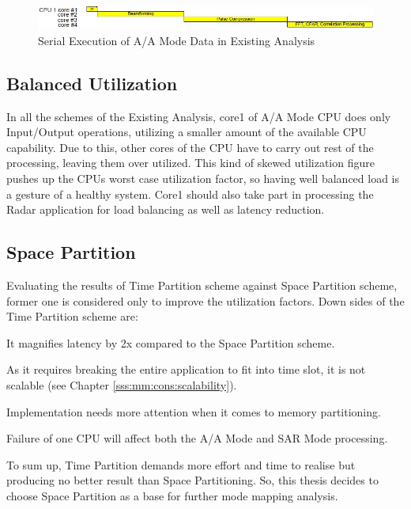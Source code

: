\begin{figure}[h!]
	\centering
	\includegraphics[width=160mm]{figures/aa_serial_exe}
	\caption{Serial Execution of A/A Mode Data in Existing Analysis}
	\label{fig:mm:aa_serial_exe}
\end{figure}

\subsection{Balanced Utilization}
In all the schemes of the Existing Analysis, core1 of A/A Mode CPU does only Input/Output operations, utilizing a smaller amount of the available CPU capability. Due to this, other cores of the CPU have to carry out rest of the processing, leaving them over utilized. This kind of skewed utilization figure pushes up the CPUs worst case utilization factor, so having well balanced load is a gesture of a healthy system. Core1 should also take part in processing the Radar application for load balancing as well as latency reduction. \vspace*{0.2cm}

\subsection{Space Partition}
Evaluating the results of Time Partition scheme against Space Partition scheme, former one is considered only to improve the utilization factors. Down sides of the Time Partition scheme are:
\begin{compactitem} 
\item It magnifies latency by 2x compared to the Space Partition scheme.
\item As it requires breaking the entire application to fit into time slot, it is not scalable (see Chapter \ref{sss:mm:cons:scalability}).
\item Implementation needs more attention when it comes to memory partitioning.
\item Failure of one CPU will affect both the A/A Mode and SAR Mode processing.
\end{compactitem} 
\vspace*{0.2cm}
To sum up, Time Partition demands more effort and time to realise but producing no better result than Space Partitioning. So, this thesis decides to choose Space Partition as a base for further mode mapping analysis.


